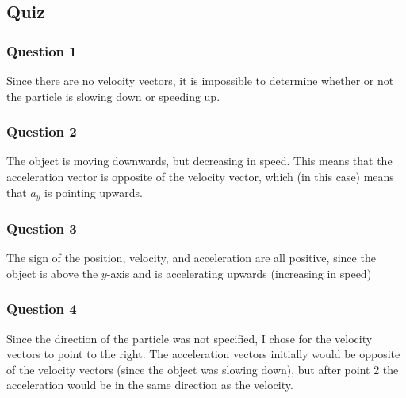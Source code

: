 
\subsection{Quiz}

\subsubsection{Question 1}

\vspace{1em}

\begin{solution}
	Since there are no velocity vectors, it is impossible to determine whether or not the particle is slowing down or speeding up.
\end{solution}

\subsubsection{Question 2}

\vspace{1em}

\begin{solution}
	The object is moving downwards, but decreasing in speed. This means that the acceleration vector is opposite of the velocity vector, which (in this case) means that $a_y$ is pointing upwards.
\end{solution}

\subsubsection{Question 3}

\vspace{1em}

\begin{solution}
	The sign of the position, velocity, and acceleration are all positive, since the object is above the $y$-axis and is accelerating upwards (increasing in speed)
\end{solution}

\subsubsection{Question 4}

\vspace{1em}

\begin{solution}
	Since the direction of the particle was not specified, I chose for the velocity vectors to point to the right. The acceleration vectors initially would be opposite of the velocity vectors (since the object was slowing down), but after point 2 the acceleration would be in the same direction as the velocity.
\end{solution}

